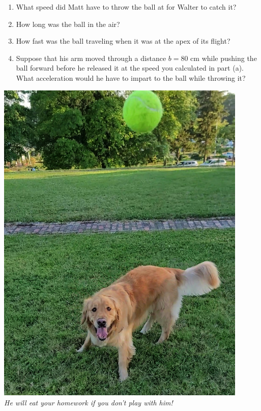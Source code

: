 \documentclass[12pt]{article}
\begin{document}
\begin{enumerate}
\begin{minipage}{0.55\textwidth}
\begin{enumerate}
	\item What speed did Matt have to throw the ball at for Walter to catch it?
	\item How long was the ball in the air?
	\item How fast was the ball traveling when it was at the apex of its flight?
	\item Suppose that his arm moved through a distance $b=80$ cm while pushing the ball forward before he released it at the speed you calculated in part (a). What acceleration would he have to impart to the ball while throwing it?
\end{enumerate}
\end{minipage}
		\begin{minipage}{0.45\textwidth}
	\begin{center}
		\includegraphics[width=0.9\textwidth]{walter.jpg}\\
		\scriptsize \it 
		He will eat your homework if you don't play with him!
	\end{center}
\end{minipage}


\end{enumerate}
\end{document}
